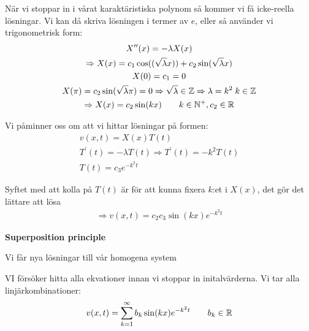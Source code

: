 \par\bigskip
\noindent När vi stoppar in i vårat karaktäristiska polynom så kommer vi få icke-reella lösningar. Vi kan då skriva lösningen i termer av $e$, eller så använder vi trigonometrisk form: 
\begin{equation*}
  \begin{gathered}
    X^{\prime\prime}(x) = -\lambda X(x)\\
    \Rightarrow X(x) = c_1\cos((\sqrt{\lambda}x))+c_2\sin(\sqrt{\lambda}x)\\
    X(0) = c_1 = 0\\
    X(\pi) = c_2\sin(\sqrt{\lambda}\pi) = 0\Rightarrow\sqrt{\lambda}\in\mathbb{Z}\Rightarrow \lambda = k^2\;k\in\mathbb{Z}\\
    \Rightarrow X(x) = c_2\sin(kx)\qquad k\in\mathbb{N}^+, c_2\in\mathbb{R}
  \end{gathered}
\end{equation*}
\par\bigskip
\noindent Vi påminner oss om att vi hittar lösningar på formen:
\begin{equation*}
  \begin{gathered}
    v(x,t) = X(x)T(t)\\
    T^{\prime}(t) = -\lambda T(t)\Rightarrow T^{\prime}(t) = -k^2 T(t)\\
    T(t) = c_3e^{-k^2t}
  \end{gathered}
\end{equation*}\par
\noindent Syftet med att kolla på $T(t)$ är för att kunna fixera $k$:et i $X(x)$, det gör det lättare att lösa
\begin{equation*}
  \begin{gathered}
    \Rightarrow v(x,t) = c_2c_3\sin(kx)e^{-k^2t}
  \end{gathered}
\end{equation*}
\par\bigskip
\noindent\textbf{Superposition principle}\par
\noindent Vi får nya lösningar till vår homogena system\par
\noindent VI försöker hitta alla ekvationer innan vi stoppar in initalvärderna. Vi tar alla linjärkombinationer:
\begin{equation*}
  \begin{gathered}
    v(x,t) = \sum_{k=1}^{\infty} b_k\sin(kx)e^{-k^2t}\qquad b_k\in\mathbb{R}
  \end{gathered}
\end{equation*}
\par\bigskip
